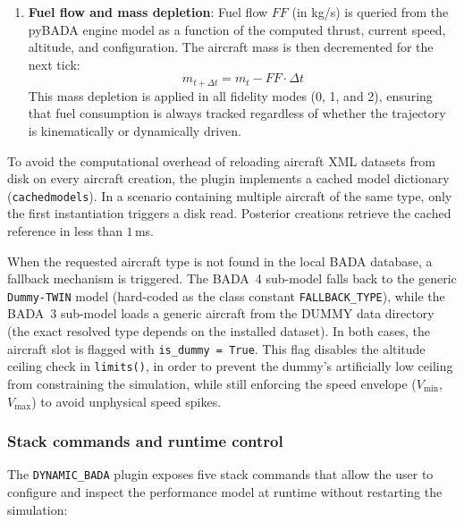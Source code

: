 \begin{enumerate}
    \item \textbf{Fuel flow and mass depletion}: Fuel flow $FF$ (in kg/s) is queried from the pyBADA engine model as a function of the computed thrust, current speed, altitude, and configuration. The aircraft mass is then decremented for the next tick:
    \begin{equation}
        m_{t+\Delta t} = m_t - FF \cdot \Delta t
        \label{eq:mass_depletion}
    \end{equation}
    This mass depletion is applied in all fidelity modes (0, 1, and 2), ensuring that fuel consumption is always tracked regardless of whether the trajectory is kinematically or dynamically driven.
\end{enumerate}

To avoid the computational overhead of reloading aircraft XML datasets from disk on every aircraft creation, the plugin implements a cached model dictionary (\texttt{cachedmodels}). In a scenario containing multiple aircraft of the same type, only the first instantiation triggers a disk read. Posterior creations retrieve the cached reference in less than $1$\,ms.

When the requested aircraft type is not found in the local BADA database, a fallback mechanism is triggered. The BADA~4 sub-model falls back to the generic \texttt{Dummy-TWIN} model (hard-coded as the class constant \texttt{FALLBACK\_TYPE}), while the BADA~3 sub-model loads a generic aircraft from the DUMMY data directory (the exact resolved type depends on the installed dataset). In both cases, the aircraft slot is flagged with \texttt{is\_dummy~=~True}. This flag disables the altitude ceiling check in \texttt{limits()}, in order to prevent the dummy's artificially low ceiling from constraining the simulation, while still enforcing the speed envelope ($V_{\min}$, $V_{\max}$) to avoid unphysical speed spikes.

\subsubsection{Stack commands and runtime control}
\label{sec:stack_commands}

The \texttt{DYNAMIC\_BADA} plugin exposes five stack commands that allow the user to configure and inspect the performance model at runtime without restarting the simulation:

